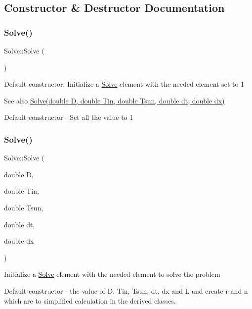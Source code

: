 \subsection{Constructor \& Destructor Documentation}
\mbox{\label{class_solve_ac437f1307c9d4669205ac7d370a55ffc}} 
\subsubsection{\texorpdfstring{Solve()}{Solve()}\hspace{0.1cm}{\footnotesize\ttfamily [1/2]}}
{\footnotesize\ttfamily Solve\+::\+Solve (\begin{DoxyParamCaption}{ }\end{DoxyParamCaption})}

Default constructor. Initialize a \hyperlink{class_solve}{Solve} element with the needed element set to 1 \begin{DoxySeeAlso}{See also}
\hyperlink{class_solve_a1e0efad6dcf6b09759dd38df7aa08db8}{Solve(double D, double Tin, double Tsun, double dt, double dx)}
\end{DoxySeeAlso}
Default constructor -\/ Set all the value to 1 \mbox{\label{class_solve_a1e0efad6dcf6b09759dd38df7aa08db8}} 
\subsubsection{\texorpdfstring{Solve()}{Solve()}\hspace{0.1cm}{\footnotesize\ttfamily [2/2]}}
{\footnotesize\ttfamily Solve\+::\+Solve (\begin{DoxyParamCaption}\item[{double}]{D,  }\item[{double}]{Tin,  }\item[{double}]{Tsun,  }\item[{double}]{dt,  }\item[{double}]{dx }\end{DoxyParamCaption})}

Initialize a \hyperlink{class_solve}{Solve} element with the needed element to solve the problem

Default constructor -\/  the value of D, Tin, Tsun, dt, dx and L and create r and n which are to simplified calculation in the derived classes. 

